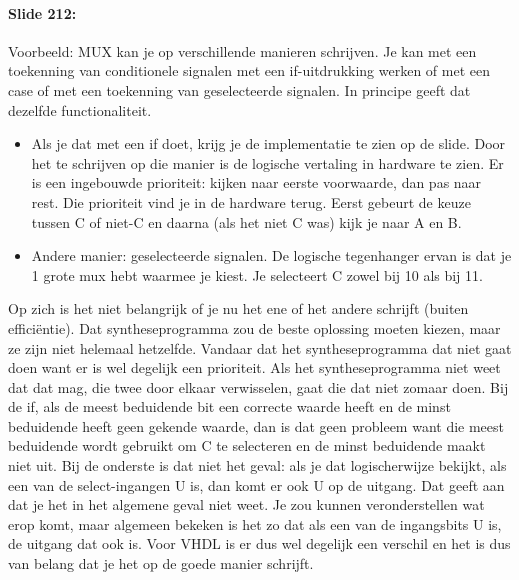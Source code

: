 \documentclass[10pt,a4paper]{book}
\begin{document}
\paragraph{Slide 212:} Voorbeeld: MUX kan je op verschillende manieren schrijven. Je  kan met een toekenning van conditionele signalen met een if-uitdrukking werken of met een case of met een toekenning van geselecteerde signalen. In principe geeft dat dezelfde functionaliteit. 
\begin{itemize}
\item Als je dat met een if doet, krijg je de implementatie te zien op de slide. Door het te schrijven op die manier is de logische vertaling in hardware te zien. Er is een ingebouwde prioriteit: kijken naar eerste voorwaarde, dan pas naar rest. Die prioriteit vind je in de hardware terug. Eerst gebeurt de keuze tussen C of niet-C en daarna (als het niet C was) kijk je naar A en B.
\item Andere manier: geselecteerde signalen. De logische tegenhanger ervan is dat je 1 grote mux hebt waarmee je kiest. Je selecteert C zowel bij 10 als bij 11.
\end{itemize}
Op zich is het niet belangrijk of je nu het ene of het andere schrijft (buiten effici\"entie). Dat syntheseprogramma zou de beste oplossing moeten kiezen, maar ze zijn niet helemaal hetzelfde. Vandaar dat het syntheseprogramma dat niet gaat doen want er is wel degelijk een prioriteit. Als het syntheseprogramma niet weet dat dat mag, die twee door elkaar verwisselen, gaat die dat niet zomaar doen. Bij de if, als de meest beduidende bit een correcte waarde heeft en de minst beduidende heeft geen gekende waarde, dan is dat geen probleem want die meest beduidende wordt gebruikt om C te selecteren en de minst beduidende maakt niet uit. Bij de onderste is dat niet het geval: als je dat logischerwijze bekijkt, als een van de select-ingangen U is, dan komt er ook U op de uitgang. Dat geeft aan dat je het in het algemene geval niet weet. Je zou kunnen veronderstellen wat erop komt, maar algemeen bekeken is het zo dat als een van de ingangsbits U is, de uitgang dat ook is. Voor VHDL is er dus wel degelijk een verschil en het is dus van belang dat je het op de goede manier schrijft. 
\end{document}
